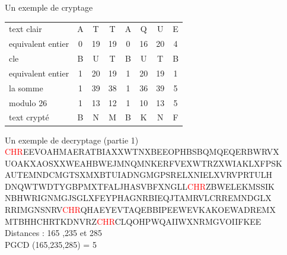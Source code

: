 \documentclass[10pt,xcolor=table]{beamer}
\begin{document}
\begin{frame}

\begin{exampleblock}{Un exemple de cryptage} %
\begin{tabular}{l!{\vrule}ccccccc} 
text clair & A & T & T & A & Q & U & E \\  
equivalent entier & 0 & 19 & 19 & 0 & 16 & 20 & 4 \\ 
cle & B & U & T & B & U & T & B \\ 
equivalent entier & 1 & 20 & 19 & 1 & 20 & 19 & 1\\ \hline
la somme & 1 & 39 & 38 & 1 & 36 & 39 & 5 \\ \hline
modulo 26 & 1 & 13 & 12 & 1 & 10 & 13 & 5  \\ \hline
text crypté & B & N & M & B & K & N & F  \\
\end{tabular}
\end{exampleblock}
\begin{exampleblock}{Un exemple de decryptage (partie 1)} %
 \textcolor{red}{CHR}EEVOAHMAERATBIAXXWTNXBEEOPHBSBQMQEQERBWRVX
 UOAKXAOSXXWEAHBWEJMNQMNKERFVEXWTRZXWIAKLXFPSK
 AUTEMNDCMGTSXMXBTUIADNGMGPSRELXNIELXVRVPRTULH
 DNQWTWDTYGBPMXTFALJHASVBFXNGLL\textcolor{red}{CHR}ZBWELEKMSSIK
 NBHWRIGNMGJSGLXFEYPHAGNRBIEQJTAMRVLCRREMNDGLX
 RRIMGNSNRV\textcolor{red}{CHR}QHAEYEVTAQEBBIPEEWEVKAKOEWADREMX
 MTBHHCHRTKDNVRZ\textcolor{red}{CHR}CLQOHPWQAIIWXNRMGVOIIFKEE\\ \pause
 Distances : 165 ,235 et 285 \\ \pause
 PGCD (165,235,285) = 5 
\end{exampleblock}
\end{frame}
\end{document}
